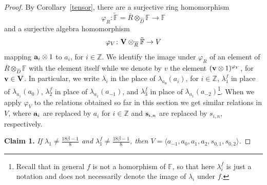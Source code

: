 \documentclass[a4paper]{amsart}
\newcommand{\Ro}{{\overline R}}
\newcommand{\Vo}{{\bf V}}
\newcommand{\F}{{\mathbb F}}
\newcommand{\Z}{{\mathbb Z}}
\newcommand{\lmu}{\lambda_1}
\newcommand{\lmf}{\lambda_1^f}
\newcommand{\lmdf}{\lambda_2^f}
\newcommand{\lmt}{\lambda_3}
\newcommand{\bt}{\beta}
\newcommand{\bv}{{\bf v}}
\newcommand{\ba}{{\bf a}}
\newcommand{\bs}{{\bf s}}
\begin{document}
\begin{proof}
By Corollary~\ref{tensor}, there are a surjective ring homomorphism 
$$
\varphi_R\colon \tilde \F=\Ro\otimes _{\hat D}\F \to \F
$$ 
and a surjective algebra homomorphism  
$$
\varphi_V\colon \Vo\otimes_{\Ro} \tilde \F\to V
$$
mapping $\ba_i\otimes 1$ to $a_i$, for $i\in \Z$. We identify the image under $\varphi_R$ of an element of $\Ro\otimes_{\hat D} \F$ with the element itself while we denote by $v$ the element $(\bv\otimes 1)^{\varphi_V}$, for $\bv\in \Vo$. In particular, we write $\lambda_i$ in the place of $\lambda_{a_0}(a_i)$, for $i\in \Z$, $\lmf$ in place of $\lambda_{a_1}(a_0)$, $\lmdf$ in place of $\lambda_{a_1}(a_{-1})$, and  $\lmt^f$ in place of $\lambda_{a_1}(a_{-2})$\footnote{Recall that in general $f$ is not a homorphism of $\F$, so that here $\lambda_i^f$ is just a notation and does not necessarily denote the image of $\lambda_i$ under $f$.}. When we apply $\varphi_V$ to the relations obtained so far in this section  we get similar relations in $V$, where  $\ba_{i}$ are replaced by $a_{i}$ for $i\in \Z$ and $\bs_{i,n}$ are replaced by $s_{i,n}$, respectively.
\medskip

{\bf Claim 1.} {\it If $\lmu\neq \frac{18\bt-1}{8}$ and  $\lmf\neq \frac{18\bt-1}{8}$, then $V=\langle a_{-1}, a_0, a_1, a_2, s_{0,1}, s_{0,2} \rangle$.}
\medskip


\end{proof}
\end{document}
